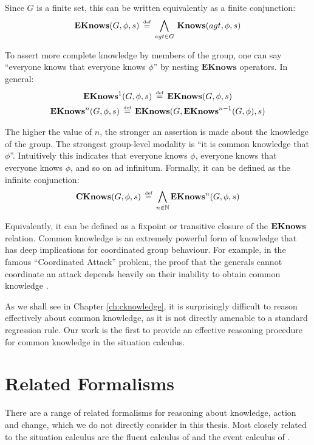 Since $G$ is a finite set, this can be written equivalently as a
finite conjunction:\[
\mathbf{EKnows}(G,\phi,s)\,\stackrel{\mbox{\tiny def}}{=}\,\bigwedge_{agt\in G}\,\mathbf{Knows}(agt,\phi,s)\]


To assert more complete knowledge by members of the group, one can
say {}``everyone knows that everyone knows $\phi$'' by nesting
$\mathbf{EKnows}$ operators. In general:\begin{gather*}
\mathbf{EKnows}^{1}(G,\phi,s)\,\stackrel{\mbox{\tiny def}}{=}\,\mathbf{EKnows}(G,\phi,s)\\
\mathbf{EKnows}^{n}(G,\phi,s)\,\stackrel{\mbox{\tiny def}}{=}\,\mathbf{EKnows}(G,\mathbf{EKnows}^{n-1}(G,\phi),s)\end{gather*}


The higher the value of $n$, the stronger an assertion is made about
the knowledge of the group. The strongest group-level modality is
{}``it is common knowledge that $\phi$''. Intuitively this indicates
that everyone knows $\phi$, everyone knows that everyone knows $\phi$,
and so on ad infinitum. Formally, it can be defined as the infinite
conjunction:\[
\mathbf{CKnows}(G,\phi,s)\,\stackrel{\mbox{\tiny def}}{=}\,\bigwedge_{n\in\mathbb{N}}\mathbf{EKnows}^{n}(G,\phi,s)\]


Equivalently, it can be defined as a fixpoint or transitive closure
of the $\mathbf{EKnows}$ relation. Common knowledge is an extremely powerful
form of knowledge that has deep implications for coordinated group
behaviour. For example, in the famous {}``Coordinated Attack'' problem,
the proof that the generals cannot coordinate an attack depends heavily
on their inability to obtain common knowledge \citep{halpern90knowledge_distrib}.

As we shall see in Chapter \ref{ch:cknowledge}, it is surprisingly
difficult to reason effectively about common knowledge, as it is not
directly amenable to a standard regression rule. Our work is the first
to provide an effective reasoning procedure for common knowledge in
the situation calculus.


\section{Related Formalisms}

\label{sec:Background:Related-Formalisms}

There are a range of related formalisms for reasoning about knowledge,
action and change, which we do not directly consider in this thesis.
Most closely related to the situation calculus are the fluent calculus
of \citet{thielscher98fluent_calculus} and the event calculus of
\citet{kowalski86event_calculus}.

